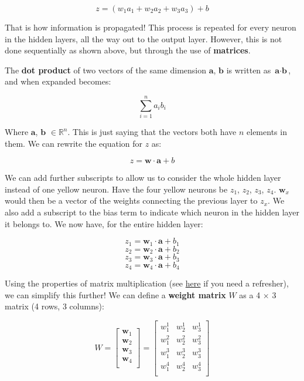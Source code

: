 \begin{flushleft}
    $$z = (w_1a_1 + w_2a_2 + w_3a_3) + b$$

    That is how information is propagated! This process is repeated for every neuron in the hidden layers, all the way out to the output layer. However, this is not done sequentially as shown above, but through the use of \textbf{matrices}.

    The \textbf{dot product} of two vectors of the same dimension $\textbf{a}$, $\textbf{b}$ is written as $\textbf{a} \cdot \textbf{b}$, and when expanded becomes:

    $$\sum_{i=1}^n a_ib_i$$

    Where $\textbf{a}$, $\textbf{b}$ $\in \mathbb{R}^n$. This is just saying that the vectors both have $n$ elements in them. We can rewrite the equation for $z$ as:

    $$z = \textbf{w}\cdot\textbf{a} + b$$

    We can add further subscripts to allow us to consider the whole hidden layer instead of one yellow neuron. Have the four yellow neurons be $z_1$, $z_2$, $z_3$, $z_4$. $\textbf{w}_x$ would then be a vector of the weights connecting the previous layer to $z_x$. We also add a subscript to the bias term to indicate which neuron in the hidden layer it belongs to. We now have, for the entire hidden layer:

    $$z_1 = \textbf{w}_1\cdot\textbf{a} + b_1$$
    $$z_2 = \textbf{w}_2\cdot\textbf{a} + b_2$$
    $$z_3 = \textbf{w}_3\cdot\textbf{a} + b_3$$
    $$z_4 = \textbf{w}_4\cdot\textbf{a} + b_4$$

    Using the properties of matrix multiplication (see \href{https://www.mathsisfun.com/algebra/matrix-multiplying.html}{here} if you need a refresher), we can simplify this further! We can define a \textbf{weight matrix} $W$ as a 4 $\times$ 3 matrix (4 rows, 3 columns):

    $$W = \begin{bmatrix}
            \textbf{w}_1\\
            \textbf{w}_2\\
            \textbf{w}_3\\
            \textbf{w}_4\\
            \end{bmatrix} = \begin{bmatrix}
                            w^1_1 & w^1_2 & w^1_3 \\
                            w^2_1 & w^2_2 & w^2_3 \\
                            w^3_1 & w^3_2 & w^3_3 \\
                            w^4_1 & w^4_2 & w^4_3 \\
                            \end{bmatrix}$$


\end{flushleft}
